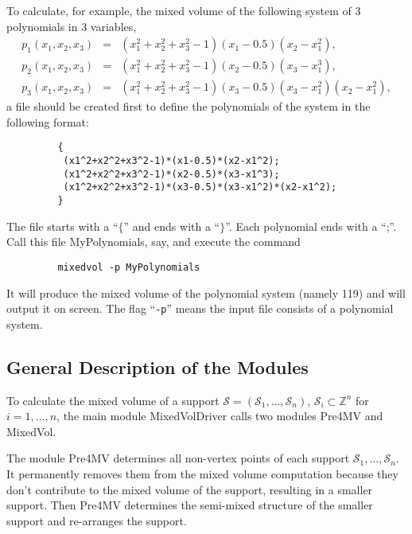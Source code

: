 \documentclass[acmtocl]{acmtrans2m}
\newcommand{\calA}{{\mathcal S}}
\begin{document}
To calculate, for example, the mixed volume of the following system of 3 polynomials
in 3 variables,
\begin{eqnarray*}
p_1(x_1,x_2,x_3)&=& (x_1^2+x_2^2+x_3^2-1)(x_1-0.5)(x_2-x_1^2), \\
p_2(x_1,x_2,x_3)&=& (x_1^2+x_2^2+x_3^2-1)(x_2-0.5)(x_3-x_1^3), \\
p_3(x_1,x_2,x_3)&=& (x_1^2+x_2^2+x_3^2-1)(x_3-0.5)(x_3-x_1^2)(x_2-x_1^2),
\end{eqnarray*}
a file should be created first to define the polynomials of the
system in the following format:
\begin{verbatim}
         {
          (x1^2+x2^2+x3^2-1)*(x1-0.5)*(x2-x1^2);
          (x1^2+x2^2+x3^2-1)*(x2-0.5)*(x3-x1^3);
          (x1^2+x2^2+x3^2-1)*(x3-0.5)*(x3-x1^2)*(x2-x1^2);
         }
\end{verbatim}
The file starts with a ``$\{$'' and ends with a ``$\}$''. Each polynomial ends with a ``;''.
Call this file MyPolynomials, say, and execute the command
\begin{verbatim}
         mixedvol -p MyPolynomials
\end{verbatim}
It will produce the mixed volume of the polynomial system (namely 119)
and will output it on screen.
The flag ``{\tt -p}'' means the input file consists of a polynomial system.

\subsection{General Description of the Modules}

To calculate the mixed volume of a support
$\calA=(\calA_1,\dots,\calA_n)$, $\calA_i\subset\mathbb Z^n$ for
$i=1,\dots,n$, the main module MixedVolDriver
calls two modules Pre4MV and MixedVol.

The module Pre4MV determines all non-vertex points of each
support $\calA_1,\dots,\calA_n$.  It
permanently removes them from the mixed volume computation
because they don't contribute to the mixed volume of the support,
resulting in a smaller support.
Then Pre4MV determines the semi-mixed structure of the smaller support
and re-arranges the support.
\end{document}
